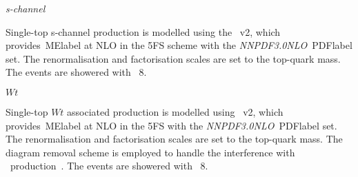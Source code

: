 \textit{s-channel}

Single-top s-channel production is modelled using the \POWHEGBOX~v2, which provides~\acrshort{MElabel} at NLO in the 5FS scheme with the \textit{NNPDF3.0NLO}~\acrshort{PDFlabel} set. The renormalisation and factorisation scales are set to the top-quark mass. The events are showered with \PYTHIA~8.

\textit{$Wt$}

Single-top $Wt$ associated production is modelled using \POWHEGBOX~v2, which provides~\acrshort{MElabel} at NLO in the 5FS with the \textit{NNPDF3.0NLO}~\acrshort{PDFlabel} set. The renormalisation and factorisation scales are set to the top-quark mass. The diagram removal scheme is employed to handle the interference with \ttbar\ production~\cite{ATL-PHYS-PUB-2016-020,Frixione_2008}. %
The events are showered with \PYTHIA~8.

